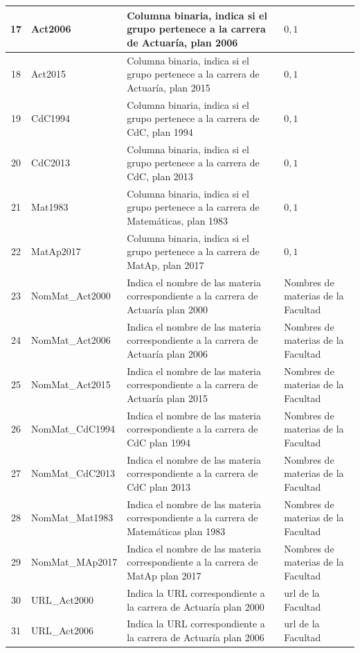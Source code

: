 {\begin{longtable}{|c|l|p{7cm}|p{2.6cm}|}
\hline 
17 & Act2006 & Columna binaria, indica si el grupo pertenece a la carrera de Actuaría, plan 2006 & $0,1$ \\ 
\hline 
18 & Act2015 & Columna binaria, indica si el grupo pertenece a la carrera de Actuaría, plan 2015 & $0,1$ \\ 
\hline 
19 & CdC1994 & Columna binaria, indica si el grupo pertenece a la carrera de CdC, plan 1994 & $0,1$ \\ 
\hline 
20 & CdC2013 & Columna binaria, indica si el grupo pertenece a la carrera de CdC, plan 2013 & $0,1$ \\ 
\hline 
21 & Mat1983 & Columna binaria, indica si el grupo pertenece a la carrera de Matemáticas, plan 1983 & $0,1$ \\ 
\hline 
22 & MatAp2017 & Columna binaria, indica si el grupo pertenece a la carrera de MatAp, plan 2017 & $0,1$ \\ 
\hline 
23 & NomMat\_Act2000 & Indica el nombre de las materia correspondiente a la carrera de Actuaría plan 2000 & Nombres de materias de la Facultad \\ 
\hline 
24 & NomMat\_Act2006 & Indica el nombre de las materia correspondiente a la carrera de Actuaría plan 2006 & Nombres de materias de la Facultad \\ 
\hline 
25 & NomMat\_Act2015 & Indica el nombre de las materia correspondiente a la carrera de Actuaría plan 2015 & Nombres de materias de la Facultad \\ 
\hline 
26 & NomMat\_CdC1994 & Indica el nombre de las materia correspondiente a la carrera de CdC plan 1994 & Nombres de materias de la Facultad \\ 
\hline 
27 & NomMat\_CdC2013 & Indica el nombre de las materia correspondiente a la carrera de CdC plan 2013 & Nombres de materias de la Facultad \\ 
\hline 
28 & NomMat\_Mat1983 & Indica el nombre de las materia correspondiente a la carrera de Matemáticas plan 1983 & Nombres de materias de la Facultad \\ 
\hline 
29 & NomMat\_MAp2017 & Indica el nombre de las materia correspondiente a la carrera de MatAp plan 2017 & Nombres de materias de la Facultad \\ 
\hline 
30 & URL\_Act2000 & Indica la URL correspondiente a la carrera de Actuaría plan 2000 & url de la Facultad \\ 
\hline 
31 & URL\_Act2006 & Indica la URL correspondiente a la carrera de Actuaría plan 2006 & url de la Facultad \\ 

\end{longtable}}
